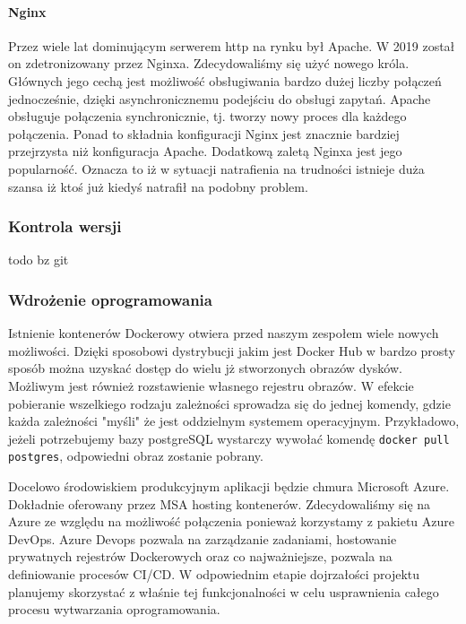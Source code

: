 \documentclass[10pt, titlepage, oneside, a4paper]{article}
\begin{document}
	\paragraph{Nginx} \mbox{} \par
	Przez wiele lat dominującym serwerem http na rynku był Apache. W 2019 został on zdetronizowany przez Nginxa. 
	Zdecydowaliśmy się użyć nowego króla. Głównych jego cechą jest możliwość obsługiwania bardzo dużej liczby
	połączeń jednocześnie, dzięki asynchronicznemu podejściu do obsługi zapytań. Apache obsługuje połączenia
	synchronicznie, tj. tworzy nowy proces dla każdego połączenia. Ponad to składnia konfiguracji Nginx jest
	znacznie bardziej przejrzysta niż konfiguracja Apache. Dodatkową zaletą Nginxa jest jego popularność. Oznacza
	to iż w sytuacji natrafienia na trudności istnieje duża szansa iż ktoś już kiedyś natrafił na podobny problem.
	
	\subsubsection{Kontrola wersji}
	todo bz git
	  
	\subsubsection{Wdrożenie oprogramowania}
	Istnienie kontenerów Dockerowy otwiera przed naszym zespołem wiele nowych możliwości. Dzięki sposobowi dystrybucji
	jakim jest Docker Hub w bardzo prosty sposób można uzyskać dostęp do wielu jż stworzonych obrazów dysków. Możliwym
	jest również rozstawienie własnego rejestru obrazów. W efekcie pobieranie wszelkiego rodzaju zależności sprowadza
	się do jednej komendy, gdzie każda zależności "myśli" że jest oddzielnym systemem operacyjnym. Przykładowo,
	jeżeli potrzebujemy bazy postgreSQL wystarczy wywołać komendę \texttt{docker pull postgres}, odpowiedni obraz
	zostanie pobrany.
	
	Docelowo środowiskiem produkcyjnym aplikacji będzie chmura Microsoft Azure. Dokładnie oferowany przez MSA hosting
	kontenerów. Zdecydowaliśmy się na Azure ze względu na możliwość połączenia ponieważ korzystamy z pakietu Azure DevOps. 
	Azure Devops pozwala na zarządzanie zadaniami, hostowanie prywatnych rejestrów Dockerowych oraz co najważniejsze,
	pozwala na definiowanie procesów CI/CD. W odpowiednim etapie dojrzałości projektu planujemy skorzystać z właśnie
	tej funkcjonalności w celu usprawnienia całego procesu wytwarzania oprogramowania.

	  
\end{document}
